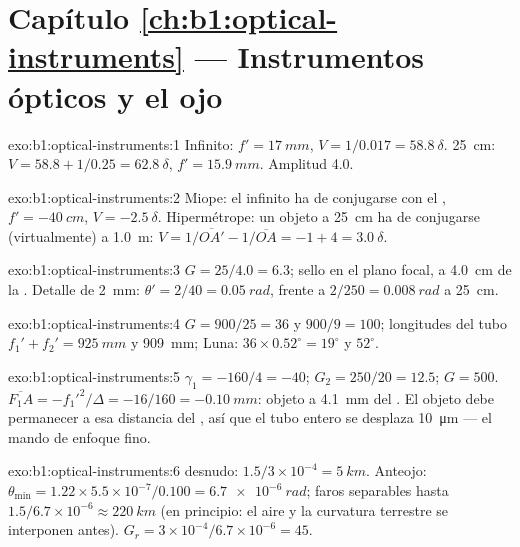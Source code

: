 \section*{Capítulo \ref{ch:b1:optical-instruments} --- Instrumentos ópticos y el ojo}

\begin{solution}{exo:b1:optical-instruments:1}
Infinito: $f' = \qty{17}{mm}$, $V = 1/0.017 = \qty{58.8}{\delta}$.
\qty{25}{cm}: $V = 58.8 + 1/0.25 = \qty{62.8}{\delta}$, $f' = \qty{15.9}{mm}$.
Amplitud \qty{4.0}{\delta}.
\end{solution}

\begin{solution}{exo:b1:optical-instruments:2}
Miope: el infinito ha de conjugarse con el , $f' = \qty{-40}{cm}$,
$V = \qty{-2.5}{\delta}$. Hipermétrope: un objeto a \qty{25}{cm} ha de
conjugarse (virtualmente) a \qty{1.0}{m}: $V = 1/\overline{OA'} - 1/\overline{OA}
= -1 + 4 = \qty{+3.0}{\delta}$.
\end{solution}

\begin{solution}{exo:b1:optical-instruments:3}
$G = 25/4.0 = 6.3$; sello en el plano focal, a \qty{4.0}{cm} de la
. Detalle de \qty{2}{mm}: $\theta' = 2/40 = \qty{0.05}{rad}$, frente a
$2/250 = \qty{0.008}{rad}$ a \qty{25}{cm}.
\end{solution}

\begin{solution}{exo:b1:optical-instruments:4}
$G = 900/25 = 36$ y $900/9 = 100$; longitudes del tubo $f_1' + f_2' =
\qty{925}{mm}$ y \qty{909}{mm}; Luna: $36 \times 0.52^\circ = 19^\circ$
y $52^\circ$.
\end{solution}

\begin{solution}{exo:b1:optical-instruments:5}
$\gamma_1 = -160/4 = -40$; $G_2 = 250/20 = 12.5$; $G = 500$.
$\overline{F_1A} = -f_1'^2/\Delta = -16/160 = \qty{-0.10}{mm}$: objeto a
\qty{4.1}{mm} del . El objeto debe permanecer a esa distancia del
, así que el tubo entero se desplaza \qty{10}{\micro m} --- el
mando de enfoque fino.
\end{solution}

\begin{solution}{exo:b1:optical-instruments:6}
 desnudo: $1.5/3\times10^{-4} = \qty{5}{km}$. Anteojo: $\theta_{\min}
= 1.22 \times 5.5\times10^{-7}/0.100 = \qty{6.7e-6}{rad}$; faros
separables hasta $1.5/6.7\times10^{-6} \approx \qty{220}{km}$ (en
principio: el aire y la curvatura terrestre se interponen antes).
$G_r = 3\times10^{-4}/
6.7\times10^{-6} = 45$.
\end{solution}

